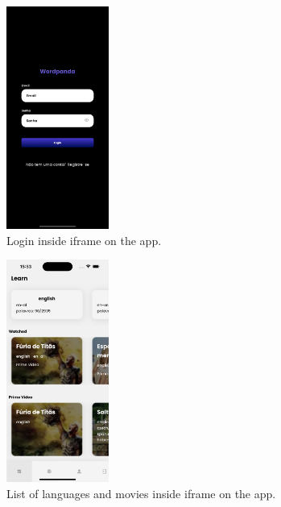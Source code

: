 \documentclass[12pt]{article}
\begin{document}
  \begin{figure}[!h]
    \centering
    \caption{
    Login inside iframe on the app.
    }
    \label{fig:app1}
    \includegraphics[width=0.3\textwidth]{assets/14.png}
  \end{figure}

  \begin{figure}[!h]
    \centering
    \caption{
     List of languages and movies inside iframe on the app.
    }
    \label{fig:app2}
    \includegraphics[width=0.3\textwidth]{assets/15.png}
  \end{figure}
\end{document}
